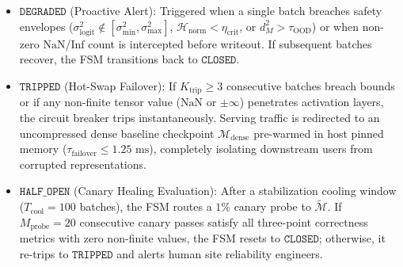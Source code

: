 \begin{itemize}
\begin{itemize}
        \item $\mathtt{DEGRADED}$ (Proactive Alert): Triggered when a single batch breaches safety envelopes ($\sigma_{\text{logit}}^2 \notin [\sigma_{\min}^2, \sigma_{\max}^2]$, $\mathcal{H}_{\text{norm}} < \eta_{\text{crit}}$, or $d_M^2 > \tau_{\text{OOD}}$) or when non-zero $\mathrm{NaN}$/$\mathrm{Inf}$ count is intercepted before writeout. If subsequent batches recover, the FSM transitions back to $\mathtt{CLOSED}$.
        \item $\mathtt{TRIPPED}$ (Hot-Swap Failover): If $K_{\text{trip}} \ge 3$ consecutive batches breach bounds or if any non-finite tensor value ($\mathrm{NaN}$ or $\pm\infty$) penetrates activation layers, the circuit breaker trips instantaneously. Serving traffic is redirected to an uncompressed dense baseline checkpoint $\mathcal{M}_{\text{dense}}$ pre-warmed in host pinned memory ($\tau_{\text{failover}} \le 1.25\text{ ms}$), completely isolating downstream users from corrupted representations.
        \item $\mathtt{HALF\_OPEN}$ (Canary Healing Evaluation): After a stabilization cooling window ($T_{\text{cool}} = 100$ batches), the FSM routes a $1\%$ canary probe to $\widetilde{\mathcal{M}}$. If $M_{\text{probe}} = 20$ consecutive canary passes satisfy all three-point correctness metrics with zero non-finite values, the FSM resets to $\mathtt{CLOSED}$; otherwise, it re-trips to $\mathtt{TRIPPED}$ and alerts human site reliability engineers.
    \end{itemize}
\end{itemize}

